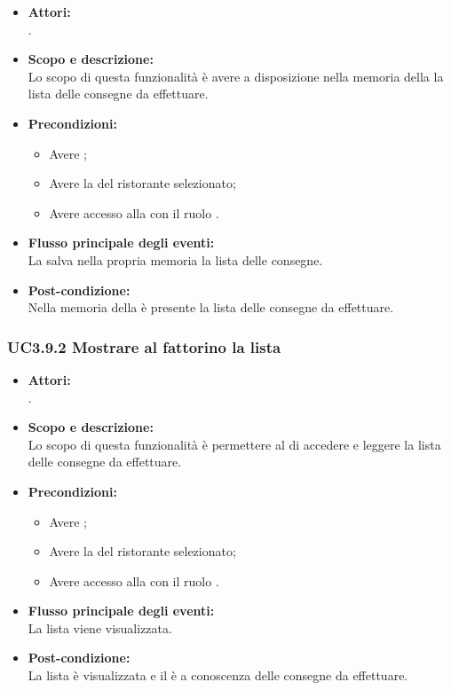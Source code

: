 \begin{itemize}
	\item \textbf{Attori:}
	\\.
	\item \textbf{Scopo e descrizione:} 
	\\Lo scopo di questa funzionalità è avere a disposizione nella memoria della  la lista delle consegne da effettuare.
	\item \textbf{Precondizioni:}
	\begin{itemize}
		\item Avere ;
		\item Avere la  del ristorante selezionato;
		\item Avere accesso alla  con il ruolo .
	\end{itemize}
	\item \textbf{Flusso principale degli eventi:}
	\\La {} salva nella propria memoria la lista delle consegne.
	\item \textbf{Post-condizione:}
	\\Nella memoria della  è presente la lista delle consegne da effettuare.
\end{itemize}

\subsubsection{UC3.9.2 Mostrare al fattorino la lista} \label{UC3.9.2}

\begin{itemize}
	\item \textbf{Attori:}
	\\.
	\item \textbf{Scopo e descrizione:} 
	\\Lo scopo di questa funzionalità è permettere al  di accedere e leggere la lista delle consegne da effettuare.
	\item \textbf{Precondizioni:}
	\begin{itemize}
		\item Avere ;
		\item Avere la  del ristorante selezionato;
		\item Avere accesso alla  con il ruolo .
	\end{itemize}
	\item \textbf{Flusso principale degli eventi:}
	\\La lista viene visualizzata.
	\item \textbf{Post-condizione:}
	\\La lista è visualizzata e il  è a conoscenza delle consegne da effettuare.
\end{itemize}

